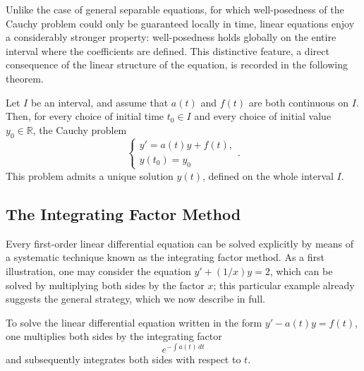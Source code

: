 Unlike the case of general separable equations, for which well-posedness of the Cauchy problem could only be guaranteed locally in time, linear equations enjoy a considerably stronger property: well-posedness holds globally on the entire interval where the coefficients are defined. This distinctive feature, a direct consequence of the linear structure of the equation, is recorded in the following theorem.

\begin{theorem}
Let $I$ be an interval, and assume that $a(t)$ and $f(t)$ are both continuous on $I$. Then, for every choice of initial time $t_0 \in I$ and every choice of initial value $y_0 \in \mathbb{R}$, the Cauchy problem
\[
\begin{cases}
y' = a(t) y + f(t), \\
y(t_0) = y_0
\end{cases}.
\]
This problem admits a unique solution $y(t)$, defined on the whole interval $I$.
\end{theorem}


\subsection{The Integrating Factor Method}

Every first-order linear differential equation can be solved explicitly by means of a systematic technique known as the integrating factor method. As a first illustration, one may consider the equation $y' + (1/x) y = 2$, which can be solved by multiplying both sides by the factor $x$; this particular example already suggests the general strategy, which we now describe in full.

To solve the linear differential equation written in the form $y' - a(t) y = f(t)$, one multiplies both sides by the integrating factor \[
e^{-\int a(t) \, dt}
\] and subsequently integrates both sides with respect to $t$.

